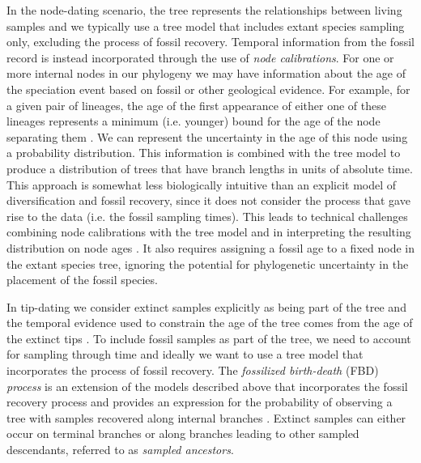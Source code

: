 In the node-dating scenario, the tree represents the relationships between living samples and we typically use a tree model that includes extant species sampling only, excluding the process of fossil recovery.
Temporal information from the fossil record is instead incorporated through the use of \textit{node calibrations}. 
For one or more internal nodes in our phylogeny we may have information about the age of the speciation event based on fossil or other geological evidence.
For example, for a given pair of lineages, the age of the first appearance of either one of these lineages represents a minimum (i.e. younger) bound for the age of the node separating them \citep{Parham2012}.
We can represent the uncertainty in the age of this node using a probability distribution. %
This information is combined with the tree model to produce a distribution of trees that have branch lengths in units of absolute time.
This approach is somewhat less biologically intuitive than an explicit model of diversification and fossil recovery, since it does not consider the process that gave rise to the data (i.e. the fossil sampling times).
This leads to technical challenges combining node calibrations with the tree model and in interpreting the resulting distribution on node ages \citep{Heled2012,Warnock2015}.
It also requires assigning a fossil age to a fixed node in the extant species tree, ignoring the potential for phylogenetic uncertainty in the placement of the fossil species.

In tip-dating we consider extinct samples explicitly as being part of the tree and the temporal evidence used to constrain the age of the tree comes from the age of the extinct tips \citep{Ronquist2012a}.
To include fossil samples as part of the tree, we need to account for sampling through time and ideally we want to use a tree model that incorporates the process of fossil recovery.
The \textit{fossilized birth-death} (FBD) \textit{process} is an extension of the models described above that incorporates the fossil recovery process and provides an expression for the probability of observing a tree with samples recovered along internal branches \citep{Stadler2010,Heath2014,Gavryushkina2014}.
Extinct samples can either occur on terminal branches or along branches leading to other sampled descendants, referred to as \textit{sampled ancestors}.

